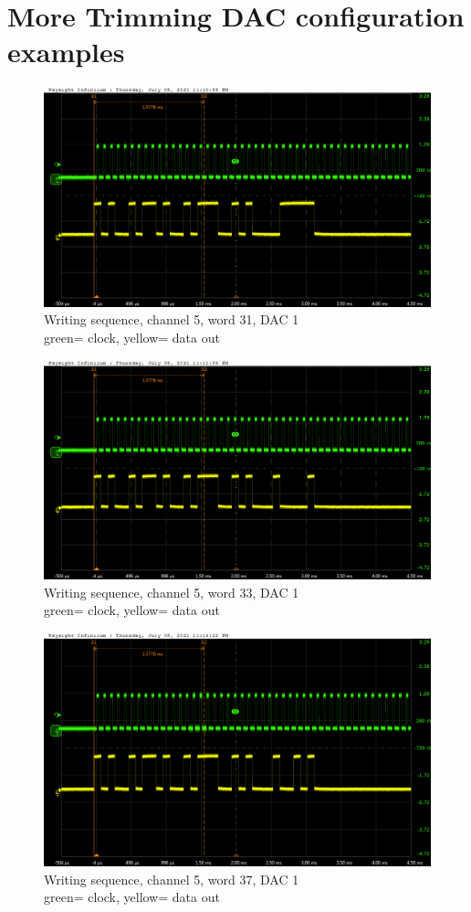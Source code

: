 \appendix
\chapter{More Trimming DAC configuration examples}\label{DacAppendix}

\begin{figure}[H]
	\centering
	\includegraphics[width=0.6\linewidth]{IMG/ch5/probe/09-08-2021_ch05-write31-baselinedac1}
	\caption{Writing sequence, channel 5, word 31, DAC 1\\{\color{green}green}= clock, {\color{yellow}yellow}= data out}
	\label{fig:ch05write31}
\end{figure}

\begin{figure}[H]
	\centering
	\includegraphics[width=0.6\linewidth]{IMG/ch5/probe/09-08-2021_ch05-write33-baselinedac1}
	\caption{Writing sequence, channel 5, word 33, DAC 1\\{\color{green}green}= clock, {\color{yellow}yellow}= data out}
	\label{fig:ch05write33}
\end{figure}
\newpage
\thispagestyle{plain}
\begin{figure}[H]
	\centering
	\includegraphics[width=0.6\linewidth]{IMG/ch5/probe/09-08-2021_ch05-write37-baselinedac1}
	\caption{Writing sequence, channel 5, word 37, DAC 1\\{\color{green}green}= clock, {\color{yellow}yellow}= data out}
	\label{fig:ch05write37}
\end{figure}

